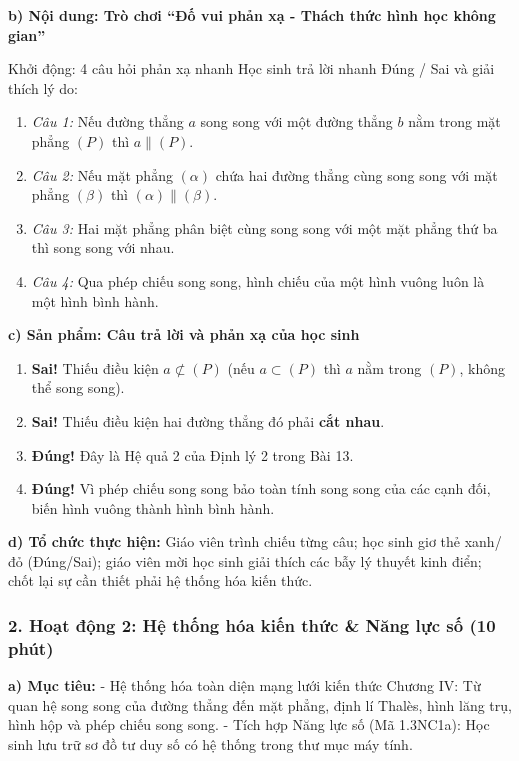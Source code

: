 \documentclass[12pt, a4paper]{article}
\begin{document}
\noindent \textbf{b) Nội dung: Trò chơi ``Đố vui phản xạ - Thách thức hình học không gian''}
\begin{pedabox}{Khởi động: 4 câu hỏi phản xạ nhanh}
Học sinh trả lời nhanh Đúng / Sai và giải thích lý do:
\begin{enumerate}[leftmargin=0.6cm]
    \item \textit{Câu 1:} Nếu đường thẳng $a$ song song với một đường thẳng $b$ nằm trong mặt phẳng $(P)$ thì $a \parallel (P)$.
    \item \textit{Câu 2:} Nếu mặt phẳng $(\alpha)$ chứa hai đường thẳng cùng song song với mặt phẳng $(\beta)$ thì $(\alpha) \parallel (\beta)$.
    \item \textit{Câu 3:} Hai mặt phẳng phân biệt cùng song song với một mặt phẳng thứ ba thì song song với nhau.
    \item \textit{Câu 4:} Qua phép chiếu song song, hình chiếu của một hình vuông luôn là một hình bình hành.
\end{enumerate}
\end{pedabox}

\noindent \textbf{c) Sản phẩm: Câu trả lời và phản xạ của học sinh}
\begin{enumerate}[leftmargin=0.6cm]
    \item \textbf{Sai!} Thiếu điều kiện $a \not\subset (P)$ (nếu $a \subset (P)$ thì $a$ nằm trong $(P)$, không thể song song).
    \item \textbf{Sai!} Thiếu điều kiện hai đường thẳng đó phải \textbf{cắt nhau}.
    \item \textbf{Đúng!} Đây là Hệ quả 2 của Định lý 2 trong Bài 13.
    \item \textbf{Đúng!} Vì phép chiếu song song bảo toàn tính song song của các cạnh đối, biến hình vuông thành hình bình hành.
\end{enumerate}

\noindent \textbf{d) Tổ chức thực hiện:}
Giáo viên trình chiếu từng câu; học sinh giơ thẻ xanh/đỏ (Đúng/Sai); giáo viên mời học sinh giải thích các bẫy lý thuyết kinh điển; chốt lại sự cần thiết phải hệ thống hóa kiến thức.

\subsubsection*{2. Hoạt động 2: Hệ thống hóa kiến thức & Năng lực số (10 phút)}

\noindent \textbf{a) Mục tiêu:}
- Hệ thống hóa toàn diện mạng lưới kiến thức Chương IV: Từ quan hệ song song của đường thẳng đến mặt phẳng, định lí Thalès, hình lăng trụ, hình hộp và phép chiếu song song.
- Tích hợp Năng lực số (Mã 1.3NC1a): Học sinh lưu trữ sơ đồ tư duy số có hệ thống trong thư mục máy tính.
\end{document}
